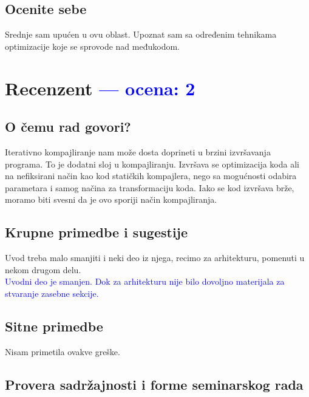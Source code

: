 \documentclass[a4paper]{report}
\newcommand{\odgovor}[1]{\textcolor{blue}{#1}}
\begin{document}
\section{Ocenite sebe}
Srednje sam upućen u ovu oblast. Upoznat sam sa određenim tehnikama optimizacije koje se sprovode nad međukodom.

\chapter{Recenzent \odgovor{--- ocena: 2} }


\section{O čemu rad govori?}
Iterativno kompajliranje nam može dosta doprineti u brzini izvršavanja programa. To je dodatni sloj u kompajliranju. Izvršava se optimizacija koda ali na nefiksirani način kao kod statičkih kompajlera, nego sa mogućnosti odabira parametara i samog načina za transformaciju koda. Iako se kod izvršava brže, moramo biti svesni da je ovo sporiji način kompajliranja.

\section{Krupne primedbe i sugestije}
Uvod treba malo smanjiti i neki deo iz njega, recimo za arhitekturu, pomenuti u nekom drugom delu.
\\
\odgovor{ Uvodni deo je smanjen. Dok za arhitekturu nije bilo dovoljno materijala za stvaranje zasebne sekcije. }

\section{Sitne primedbe}
Nisam primetila ovakve greške.

\section{Provera sadržajnosti i forme seminarskog rada}
\end{document}

